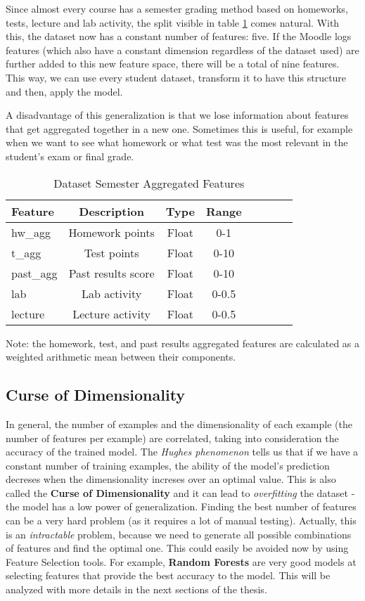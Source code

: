 Since almost every course has a semester grading method based on homeworks, 
tests, lecture and lab activity, the split visible in table \ref{table_agg} 
comes natural. With this, the dataset now has a constant number of features: 
five. If the Moodle logs features (which also have a constant dimension 
regardless of the dataset used) are further added to this new feature space, 
there will be a total of nine features. This way, we can use every student 
dataset, transform it to have this structure and then, apply the model.

A disadvantage of this generalization is that we lose information about 
features that get aggregated together in a new one. Sometimes this is useful, 
for example when we want to see what homework or what test was the most relevant 
in the student's exam or final grade.

\begin{table}[ht]
\centering
\begin{tabular}{l*{6}{c}r}
\toprule
Feature              & Description & Type & Range \\
\hline
hw\_agg               & Homework points    & Float & 0-1 \\
t\_agg                & Test points        & Float & 0-10 \\
past\_agg             & Past results score & Float & 0-10 \\
lab                   & Lab activity       & Float & 0-0.5 \\
lecture               & Lecture activity   & Float & 0-0.5 \\
\bottomrule
\end{tabular}
\caption[Dataset Agg]{Dataset Semester Aggregated Features}
\label{table_agg}
\end{table}

Note: the homework, test, and past results aggregated features are calculated as 
a weighted arithmetic mean between their components.

\subsection{Curse of Dimensionality}

In general, the number of examples and the dimensionality of each example 
(the number of features per example) are correlated, taking into consideration 
the accuracy of the trained model. The {\it Hughes phenomenon}\cite{hughes} 
tells us that if we have a constant number of training examples, the ability 
of the model's prediction decreses when the dimensionality increses over an 
optimal value. This is also called the {\bf Curse of Dimensionality} and it 
can lead to {\it overfitting} the dataset - the model has a low power of 
generalization. Finding the best number of features can be a very hard problem 
(as it requires a lot of manual testing). Actually, this is an {\it intractable} 
problem, because we need to generate all possible combinations of features and 
find the optimal one. This could easily be avoided now by using Feature Selection 
tools. For example, {\bf Random Forests} are very good models at selecting 
features that provide the best accuracy to the model. This will be analyzed 
with more details in the next sections of the thesis. 

